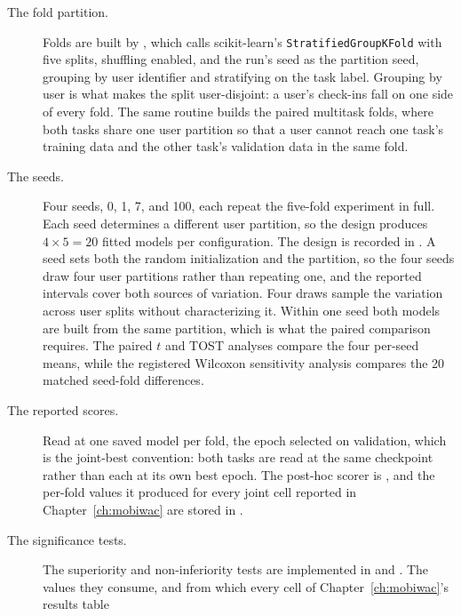 \begin{description}
  \item[The fold partition.] Folds are built by
        , which calls scikit-learn's
        \texttt{StratifiedGroupKFold} with five splits, shuffling enabled, and the run's
        seed as the partition seed, grouping by user identifier and stratifying on the task
        label. Grouping by user is what makes the split user-disjoint: a user's
        check-ins fall on one side of every fold.
        The same routine builds the paired multitask folds, where both tasks share one
        user partition so that a user
        cannot reach one task's training data and the other task's validation data in
        the same fold.
  \item[The seeds.] Four seeds, 0, 1, 7, and 100, each repeat the
        five-fold experiment in full. Each seed determines a different user
        partition, so the design produces $4\times5=20$ fitted models per
        configuration. The design is recorded in
        . A seed
        sets both the random initialization and the partition, so the four seeds draw four
        user partitions rather than repeating one, and the reported intervals cover both
        sources of variation. Four draws sample the variation across user splits without
        characterizing it. Within one seed both models are built from the same partition, which is what
        the paired comparison requires. The paired $t$ and TOST analyses compare the four
        per-seed means, while the registered Wilcoxon sensitivity analysis compares the 20
        matched seed-fold differences.
  \item[The reported scores.] Read at one saved model per fold, the epoch selected on
        validation, which is the joint-best convention: both tasks are read at the same
        checkpoint rather than each at its own best epoch. The post-hoc scorer is
        , and the per-fold values it produced for
        every joint cell reported in Chapter~\ref{ch:mobiwac} are stored in
        .
  \item[The significance tests.] The superiority and non-inferiority tests are
        implemented in 
        and . The values
        they consume, and from which every cell of Chapter~\ref{ch:mobiwac}'s results table

\end{description}
